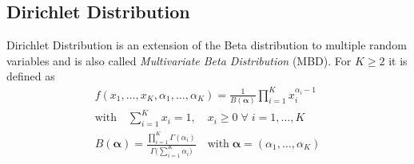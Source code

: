 \documentclass[../../probability-notes.tex]{subfiles}
\begin{document}
    \subsection{Dirichlet Distribution}
    Dirichlet Distribution is an extension of the Beta distribution to multiple random variables and is also called \emph{Multivariate Beta Distribution} (MBD). For $K \geq 2$ it is defined as
    \begin{gather*}
        f(x_{1}, \ldots, x_{K}, \alpha_{1}, \ldots, \alpha_{K}) = \frac{1}{B(\bm{\alpha})} \prod_{i=1}^{K} x_{i}^{\alpha_{i} - 1}\\
        \text{with} \quad \sum_{i=1}^{K} x_{i} = 1, \quad x_{i} \geq 0 \; \forall \; i=1,\ldots,K\\
        B(\bm{\alpha}) = \frac{\prod_{i=1}^{K}\Gamma(\alpha_{i})}{\Gamma \bigg(\sum_{i=1}^{K} \alpha_{i} \bigg)} \quad \text{with} \; \bm{\alpha} = (\alpha_{1}, \ldots, \alpha_{K})
    \end{gather*}
\end{document}
